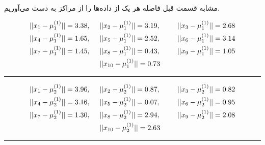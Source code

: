 \documentclass[12pt, a4paper]{article}
\begin{document}
مشابه قسمت قبل فاصله هر یک از داده‌ها را از مراکز به دست می‌آوریم.

\begin{eqnarray*}
    ||x_1 - \mu_1^{(1)}|| = 3.38, & \hspace{.5cm} ||x_2 - \mu_1^{(1)}|| = 3.19, & \hspace{.5cm} ||x_3 - \mu_1^{(1)}|| = 2.68 \\
    ||x_4 - \mu_1^{(1)}|| = 1.65, & \hspace{.5cm} ||x_5 - \mu_1^{(1)}|| = 2.52, & \hspace{.5cm} ||x_6 - \mu_1^{(1)}|| = 3.14 \\
    ||x_7 - \mu_1^{(1)}|| = 1.45, & \hspace{.5cm} ||x_8 - \mu_1^{(1)}|| = 0.43, & \hspace{.5cm} ||x_9 - \mu_1^{(1)}|| = 1.05 \\
    & \hspace{.5cm} ||x_{10} - \mu_1^{(1)}|| =  0.73&
\end{eqnarray*}

\begin{center}
    \rule{0.3\linewidth}{0.5pt}
\end{center}

\begin{eqnarray*}
    ||x_1 - \mu_2^{(1)}|| = 3.96, & \hspace{.5cm} ||x_2 - \mu_2^{(1)}|| = 0.87, & \hspace{.5cm} ||x_3 - \mu_2^{(1)}|| = 0.82 \\
    ||x_4 - \mu_2^{(1)}|| = 3.16, & \hspace{.5cm} ||x_5 - \mu_2^{(1)}|| = 0.07, & \hspace{.5cm} ||x_6 - \mu_2^{(1)}|| = 0.95 \\
    ||x_7 - \mu_2^{(1)}|| = 1.30, & \hspace{.5cm} ||x_8 - \mu_2^{(1)}|| = 2.94, & \hspace{.5cm} ||x_9 - \mu_2^{(1)}|| = 2.08 \\
    & \hspace{.5cm} ||x_{10} - \mu_2^{(1)}|| = 2.63 &
\end{eqnarray*}

\begin{center}
    \rule{0.3\linewidth}{0.5pt}
\end{center}
\end{document}
